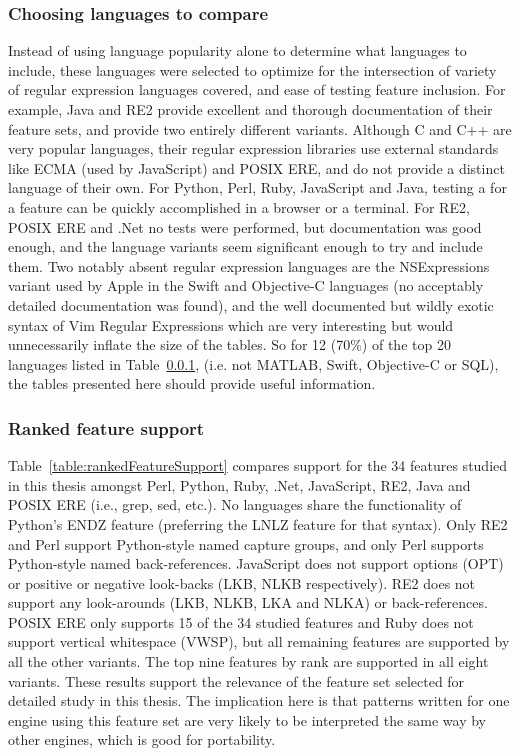

\subsubsection{Choosing languages to compare}
\label{sec:languagesChosen}
Instead of using language popularity alone to determine what languages to include, these languages were selected to optimize for the intersection of variety of regular expression languages covered, and ease of testing feature inclusion.  For example, Java and RE2 provide excellent and thorough documentation of their feature sets, and provide two entirely different variants.  Although C and C++ are very popular languages, their regular expression libraries use external standards like ECMA (used by JavaScript) and POSIX ERE, and do not provide a distinct language of their own.  For Python, Perl, Ruby, JavaScript and Java, testing a for a feature can be quickly accomplished in a browser or a terminal.  For RE2, POSIX ERE and .Net no tests were performed, but documentation was good enough, and the language variants seem significant enough to try and include them.  Two notably absent regular expression languages are the NSExpressions variant used by Apple in the Swift and Objective-C languages (no acceptably detailed documentation was found), and the well documented but wildly exotic syntax of Vim Regular Expressions which are very interesting but would unnecessarily inflate the size of the tables. So for 12 (70\%) of the top 20 languages listed in Table~\ref{sec:languagesChosen}, (i.e. not MATLAB, Swift, Objective-C or SQL), the tables presented here should provide useful information.




\subsubsection{Ranked feature support}
Table~\ref{table:rankedFeatureSupport} compares support for the 34 features studied in this thesis amongst Perl, Python, Ruby, .Net, JavaScript, RE2, Java and POSIX ERE (i.e., grep, sed, etc.).  No languages share the functionality of Python's ENDZ feature (preferring the LNLZ feature for that syntax).  Only RE2 and Perl support Python-style named capture groups, and only Perl supports Python-style named back-references.  JavaScript does not support options (OPT) or positive or negative look-backs (LKB, NLKB respectively).  RE2 does not support any look-arounds (LKB, NLKB, LKA and NLKA) or back-references.  POSIX ERE only supports 15 of the 34 studied features and Ruby does not support vertical whitespace (VWSP), but all remaining features are supported by all the other variants.  The top nine features by rank are supported in all eight variants.  These results support the relevance of the feature set selected for detailed study in this thesis.  The implication here is that patterns written for one engine using this feature set are very likely to be interpreted the same way by other engines, which is good for portability.

